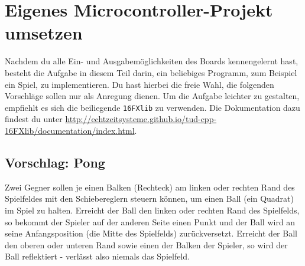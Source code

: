 \section{Eigenes Microcontroller-Projekt umsetzen \optional}
Nachdem du alle Ein- und Ausgabemöglichkeiten des Boards kennengelernt hast, besteht die Aufgabe in diesem Teil darin, ein beliebiges Programm, zum Beispiel ein Spiel, zu implementieren.
Du hast hierbei die freie Wahl, die folgenden Vorschläge sollen nur als Anregung dienen.
Um die Aufgabe leichter zu gestalten, empfiehlt es sich die beiliegende \lstinline{16FXlib} zu verwenden.
Die Dokumentation dazu findest du unter \url{http://echtzeitsysteme.github.io/tud-cpp-16FXlib/documentation/index.html}.

\subsection*{Vorschlag: Pong}
Zwei Gegner sollen je einen Balken (Rechteck) am linken oder rechten Rand des Spielfeldes mit den Schiebereglern steuern können, um einen Ball (ein Quadrat) im Spiel zu halten.
Erreicht der Ball den linken oder rechten Rand des Spielfelds, so bekommt der Spieler auf der anderen Seite einen Punkt und der Ball wird an seine Anfangsposition (die Mitte des Spielfelds) zurückversetzt.
Erreicht der Ball den oberen oder unteren Rand sowie einen der Balken der Spieler, so wird der Ball reflektiert - verlässt also niemals das Spielfeld.

